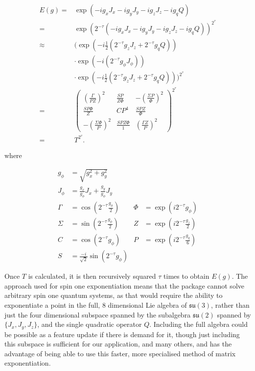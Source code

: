 \documentclass{jors}
\begin{document}
		\begin{align}
			E(g) =& \exp\left(-ig_x J_x - ig_y J_y - ig_z J_z - ig_q Q\right)\\
			=& \exp\left(2^{-\tau}\left(-ig_x J_x - ig_y J_y - ig_z J_z - ig_q Q\right)\right)^{2^\tau}\\
			\approx& \biggl(\exp\left(-i\frac12\left(2^{-\tau} g_z J_z + 2^{-\tau}g_q Q\right)\right)\nonumber\\
			&\cdot\exp\left(-i\left(2^{-\tau} g_\phi J_\phi\right)\right)\nonumber\\
			&\cdot\exp\left(-i\frac12\left(2^{-\tau} g_z J_z + 2^{-\tau} g_q Q\right)\right)\biggr)^{2^\tau}\\
			=& \begin{pmatrix}
				\left(\frac{\Gamma}{PZ}\right)^2 & \frac{SP}{Z\Phi} & -\left(\frac{\Sigma P}{\Phi}\right)^2 \\
				\frac{SP\Phi}{Z} & CP^4 & \frac{SPZ}{\Phi} \\
				-\left(\frac{\Sigma \Phi}{P}\right)^2 & \frac{SPZ\Phi}{1} & \left(\frac{\Gamma Z}{P}\right)^2
			\end{pmatrix}^{2^\tau}\\
			=& T^{2^\tau}.
		\end{align}

		where

		\begin{align}
			g_\phi &= \sqrt{g_x^2 + g_y^2}&&\nonumber\\
			J_\phi &= \frac{g_x}{g_\phi}J_x + \frac{g_y}{g_\phi}J_y&&\nonumber\\
			\Gamma &= \cos\left(2^{-\tau} \frac{g_\phi}{2}\right) & \Phi &= \exp\left(i2^{-\tau}g_\phi\right)\nonumber\\
			\Sigma &= \sin\left(2^{-\tau} \frac{g_\phi}{2}\right) & Z &= \exp\left(i2^{-\tau}\frac{g_z}{2}\right)\nonumber\\
			C &= \cos\left(2^{-\tau} g_\phi\right) & P &= \exp\left(i2^{-\tau}\frac{g_q}{6}\right)\nonumber\\
			S &= \frac{-i}{\sqrt2}\sin\left(2^{-\tau} g_\phi\right)&&
		\end{align}
	
		Once \(T\) is calculated, it is then recursively squared \(\tau\) times to obtain \(E(g)\). The approach used for spin one exponentiation means that the package cannot solve arbitrary spin one quantum systems, as that would require the ability to exponentiate a point in the full, 8 dimensional Lie algebra of \(\mathfrak{su}(3)\), rather than just the four dimensional subspace spanned by the subalgebra \(\mathfrak{su}(2)\) spanned by \(\{J_x, J_y, J_z\}\), and the single quadratic operator \(Q\). Including the full algebra could be possible as a feature update if there is demand for it, though just including this subspace is sufficient for our application, and many others, and has the advantage of being able to use this faster, more specialised method of matrix exponentiation.
\end{document}

